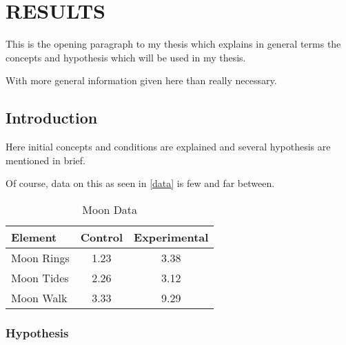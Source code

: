 \chapter{RESULTS}

This is the opening paragraph to my thesis which
explains in general terms the concepts and hypothesis
which will be used in my thesis.

With more general information given here than really
necessary.

\section{Introduction}

Here initial concepts and conditions are explained and
several hypothesis are mentioned in brief.

Of course, data on this as seen in \autoref{data}
is few and far between.

\begin{table}[h!tb] \centering
  \caption{Moon Data}
  \label{data}
  \begin{tabular}{lcc} \hline
    \textbf{Element} & \textbf{Control} & \textbf{Experimental} \\ \hline
    Moon Rings       & 1.23             & 3.38                  \\
    Moon Tides       & 2.26             & 3.12                  \\
    Moon Walk        & 3.33             & 9.29                  \\ \hline
  \end{tabular}
\end{table}

\subsection{Hypothesis}

